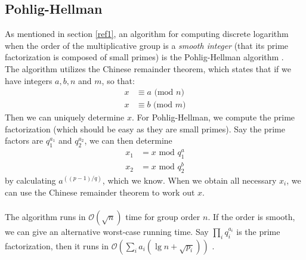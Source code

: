 \documentclass[a4paper, fleqn]{article}
\begin{document}
\subsection{Pohlig-Hellman}
As mentioned in section \ref{ref1}, an algorithm for computing discrete logarithm when the order of the multiplicative group is a \textit{smooth integer} (that its prime factorization is composed of small primes) is the Pohlig-Hellman algorithm \cite{pohlig}. \\
The algorithm utilizes the Chinese remainder theorem, which states that if we have integers $a,b,n$ and $m$, so that:
\begin{align*}
  x&\equiv a \mbox{ (mod $n$)} \\
  x&\equiv b \mbox{ (mod $m$)}
\end{align*}
Then we can uniquely determine $x$. For Pohlig-Hellman, we compute the prime factorization (which should be easy as they are small primes). Say the prime factors are $q_1^{a_1}$ and $q_2^{a_2}$, we can then determine
\begin{align*}
  x_1 &= x \mbox{ mod } q_1^a \\
  x_2 &= x \mbox{ mod } q_2^b
\end{align*}
by calculating $a^((p-1) / q)$, which we know. When we obtain all necessary $x_i$, we can use the Chinese remainder theorem to work out $x$. \\
\\
The algorithm runs in $\mathcal{O}(\sqrt{n})$ time for group order $n$. If the order is smooth, we can give an alternative worst-case running time. Say $\prod_i q_i^{a_i}$ is the prime factorization, then it runs in $\mathcal{O}\left( \sum_i a_i(\lg n + \sqrt{p_i})\right)$ \cite{menezes}.
\end{document}
